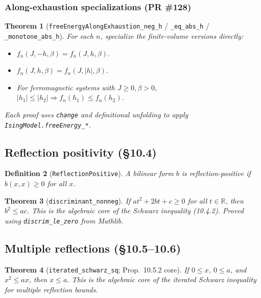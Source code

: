 \documentclass[a4paper,11pt]{article}
\newtheorem{theorem}{Theorem}
\newtheorem{definition}[theorem]{Definition}
\begin{document}
\subsubsection{Along-exhaustion specializations (PR \#128)}

\begin{theorem}[\texttt{freeEnergyAlongExhaustion\_neg\_h} /
\texttt{\_eq\_abs\_h} / \texttt{\_monotone\_abs\_h}]
For each $n$, specialize the finite-volume versions directly:
\begin{itemize}
  \item $f_n(J, -h, \beta) = f_n(J, h, \beta)$.
  \item $f_n(J, h, \beta) = f_n(J, |h|, \beta)$.
  \item For ferromagnetic systems with $J \ge 0, \beta > 0$,
        $|h_1| \le |h_2| \Rightarrow f_n(h_1) \le f_n(h_2)$.
\end{itemize}
Each proof uses \texttt{change} and definitional unfolding to apply
\texttt{IsingModel.freeEnergy\_*}.
\end{theorem}

\subsection{Reflection positivity (\S10.4)}

\begin{definition}[\texttt{ReflectionPositive}]
A bilinear form $b$ is reflection-positive if $b(x, x) \ge 0$ for all $x$.
\end{definition}

\begin{theorem}[\texttt{discriminant\_nonneg}]
If $a t^2 + 2bt + c \ge 0$ for all $t \in \mathbb{R}$, then $b^2 \le ac$.
This is the algebraic core of the Schwarz inequality (10.4.2).
Proved using \texttt{discrim\_le\_zero} from Mathlib.
\end{theorem}

\subsection{Multiple reflections (\S10.5--10.6)}

\begin{theorem}[\texttt{iterated\_schwarz\_sq}; Prop.~10.5.2 core]
If $0 \le x$, $0 \le a$, and $x^2 \le ax$, then $x \le a$.
This is the algebraic core of the iterated Schwarz inequality
for multiple reflection bounds.
\end{theorem}
\end{document}
